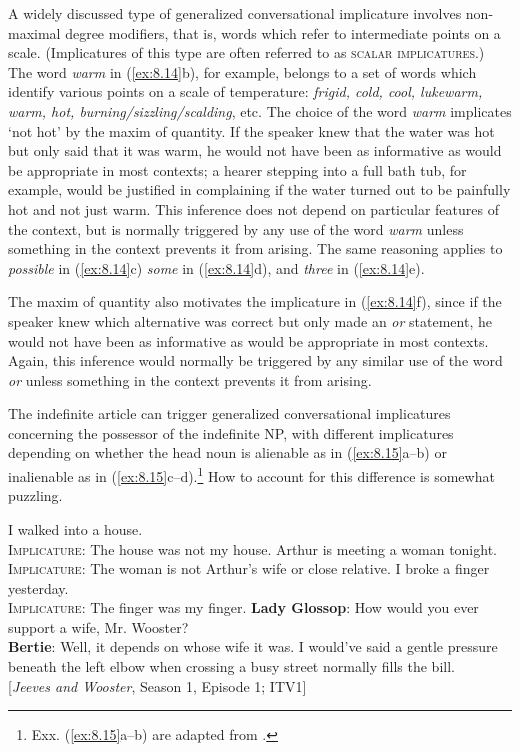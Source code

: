 A widely discussed type of generalized conversational implicature involves non-maximal degree modifiers, that is, words which refer to intermediate points on a scale. (Implicatures of this type are often referred to as \textsc{scalar implicatures}.) The word \textit{warm} in (\ref{ex:8.14}b), for example, belongs to a set of words which identify various points on a scale of temperature: \textit{frigid, cold, cool, lukewarm, warm, hot, burning/sizzling/scalding}, etc. The choice of the word \textit{warm} implicates ‘not hot’ by the maxim of quantity. If the speaker knew that the water was hot but only said that it was warm, he would not have been as informative as would be appropriate in most contexts; a hearer stepping into a full bath tub, for example, would be justified in complaining if the water turned out to be painfully hot and not just warm. This inference does not depend on particular features of the context, but is normally triggered by any use of the word \textit{warm} unless something in the context prevents it from arising. The same reasoning applies to \textit{possible} in (\ref{ex:8.14}c) \textit{some} in (\ref{ex:8.14}d), and \textit{three} in (\ref{ex:8.14}e).



The maxim of quantity also motivates the implicature in (\ref{ex:8.14}f), since if the speaker knew which alternative was correct but only made an \textit{or} statement, he would not have been as informative as would be appropriate in most contexts. Again, this inference would normally be triggered by any similar use of the word \textit{or} unless something in the context prevents it from arising.



The indefinite article can trigger generalized conversational implicatures concerning the possessor of the indefinite NP, with different implicatures depending on whether the head noun is alienable as in (\ref{ex:8.15}a--b) or inalienable as in (\ref{ex:8.15}c--d).\footnote{Exx. (\ref{ex:8.15}a--b) are adapted from \citet[56]{Grice1975}.} How to account for this difference is somewhat puzzling.


\ea \label{ex:8.15}
\ea  I walked into a house.\\
\textsc{Implicature}: The house was not my house.
\ex Arthur is meeting a woman tonight.\\
\textsc{Implicature}: The woman is not Arthur’s wife or close relative.
 \ex   I broke a finger yesterday.\\
\textsc{Implicature}: The finger was my finger.
\ex  \textbf{Lady Glossop}: How would you ever support a wife, Mr. Wooster?\\
\textbf{Bertie}: Well, it depends on whose wife it was. I would’ve said a gentle pressure beneath the left elbow when crossing a busy street normally fills the bill.\\
{}[\textit{Jeeves and Wooster}, Season 1, Episode 1; ITV1]
\z
\z

